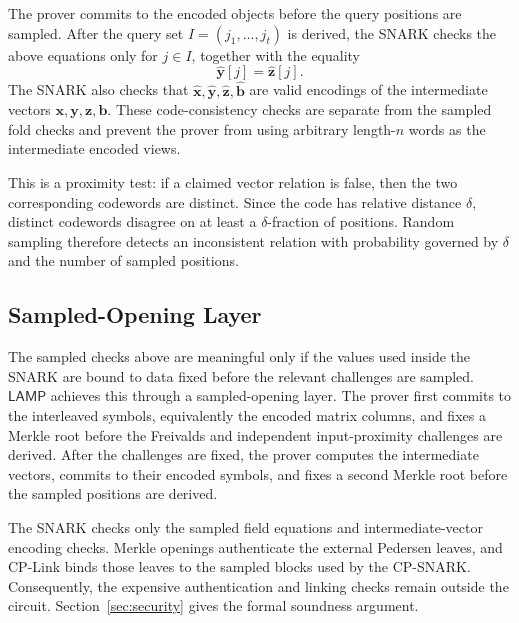 \documentclass[conference,compsoc]{IEEEtran}
\newcommand{\vect}{\mathbf}         %
\newcommand{\protocol}{\textsf{LAMP}}   %
\theoremstyle{plain}
\theoremstyle{definition}
\theoremstyle{remark}
\providecommand{\DIFaddtex}[1]{{\protect\color{DIFADD} \sf #1}} %
\providecommand{\DIFaddbegin}{} %
\providecommand{\DIFaddend}{} %
\providecommand{\DIFadd}[1]{\texorpdfstring{\DIFaddtex{#1}}{#1}} %
\providecommand{\DIFaddincludegraphics}[2][]{{\color{blue}\fbox{\DIFOincludegraphics[#1]{#2}}}} %
\DeclareRobustCommand{\DIFaddbegin}{\DIFOaddbegin \let\includegraphics\DIFaddincludegraphics} %
\DeclareRobustCommand{\DIFaddend}{\DIFOaddend \let\includegraphics\DIFOincludegraphics} %
\begin{document}
The prover commits to the encoded objects before the query positions are
sampled.  After the query set \(I=(j_1,\ldots,j_t)\) is derived, the SNARK
checks the above equations only for \(j\in I\), together with the equality
\[
  \widehat{\vect{y}}[j]=\widehat{\vect{z}}[j].
\]
The SNARK also checks that
 \DIFaddbegin \DIFadd{\(\widehat{\vect{x}},\widehat{\vect{y}},\widehat{\vect{z}},
\widehat{\vect{b}}\) }\DIFaddend are valid
encodings of the intermediate vectors
 \DIFaddbegin \DIFadd{\(\vect{x},\vect{y},\vect{z},\vect{b}\)}\DIFaddend . These code-consistency checks are separate from
the sampled fold checks and prevent the prover from using arbitrary length-\(n\)
words as the intermediate encoded views.

This is a proximity test: if a claimed vector relation is false, then the two
corresponding codewords are distinct.  Since the code has relative distance
\(\delta\), distinct codewords disagree on at least a \(\delta\)-fraction of
positions.  Random sampling therefore detects an inconsistent relation with
probability governed by \(\delta\) and the number of sampled positions.

\subsection{Sampled-Opening Layer}
\label{sec:overview-commit-link}

The sampled checks above are meaningful only if the values used inside the
SNARK are bound to data fixed before the relevant challenges are sampled.
\(\protocol\) achieves this through a sampled-opening layer.
The prover first commits to the interleaved symbols, equivalently the encoded
matrix columns, and fixes a Merkle root before the Freivalds  \DIFaddbegin \DIFadd{and independent
input-proximity challenges are }\DIFaddend derived.  After the  \DIFaddbegin \DIFadd{challenges are }\DIFaddend fixed, the prover computes the intermediate
vectors, commits to their encoded symbols, and fixes a second Merkle root before
the sampled positions are derived.

The SNARK  \DIFaddbegin \DIFadd{checks only the sampled field equations and intermediate-vector
encoding checks.  Merkle openings authenticate }\DIFaddend the external Pedersen  \DIFaddbegin \DIFadd{leaves,
and }\DIFaddend CP-Link  \DIFaddbegin \DIFadd{binds those leaves to the sampled blocks used by the CP-SNARK.
Consequently, the expensive authentication and linking checks remain outside
the circuit.  }\DIFaddend Section~\ref{sec:security}  \DIFaddbegin \DIFadd{gives the formal soundness argument}\DIFaddend .
\end{document}
